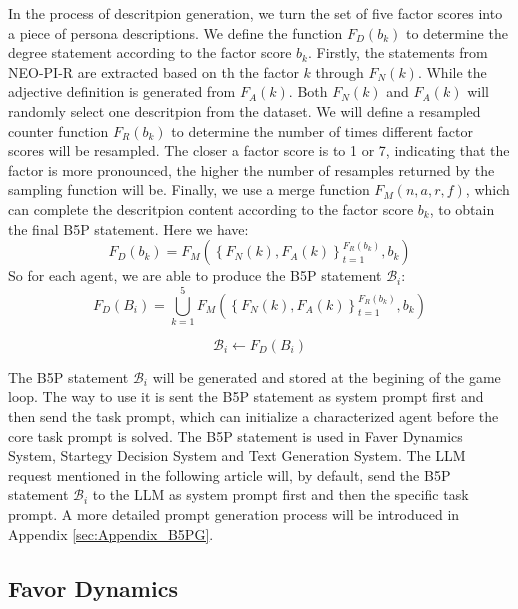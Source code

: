 \documentclass[11pt]{article}
\begin{document}
In the process of descritpion generation, we turn the set of five factor scores into a piece of persona descriptions. We define the function $ F_D(b_k) $ to determine the degree statement according to the factor score $ b_k $. Firstly, the statements from NEO-PI-R are extracted based on th the factor $ k $ through $ F_N(k) $. While the adjective definition is generated from $ F_A(k) $. Both $ F_N(k) $ and $ F_A(k) $ will randomly select one descritpion from the dataset. We will define a resampled counter function $ F_R(b_k) $ to determine the number of times different factor scores will be resampled. The closer a factor score is to 1 or 7, indicating that the factor is more pronounced, the higher the number of resamples returned by the sampling function will be. Finally, we use a merge function $ F_M(n, a, r, f) $, which can complete the descritpion content according to the factor score $ b_k $, to obtain the final B5P statement. Here we have:
\begin{equation}
  F_D(b_k) = F_M( {\left\{ F_N(k), F_A(k) \right\}}_{t=1}^{F_R(b_k)}, b_k)
\end{equation}
So for each agent, we are able to produce the B5P statement $ \mathcal{B}_i $:
\begin{equation}
   F_D(B_i) = \bigcup_{k=1}^{5} F_M( {\left\{ F_N(k), F_A(k) \right\}}_{t=1}^{F_R(b_k)}, b_k)
\end{equation}

\begin{equation}
  \mathcal{B}_i \leftarrow F_D(B_i)
\end{equation}

The B5P statement $ \mathcal{B}_i $ will be generated and stored at the begining of the game loop. The way to use it is sent the B5P statement as system prompt first and then send the task prompt, which can initialize a characterized agent before the core task prompt is solved. The B5P statement is used in Faver Dynamics System, Startegy Decision System and Text Generation System. The LLM request mentioned in the following article will, by default, send the B5P statement $ \mathcal{B}_i $ to the LLM as system prompt first and then the specific task prompt. A more detailed prompt generation process will be introduced in Appendix \ref{sec:Appendix_B5PG}.

\subsection{Favor Dynamics}
\label{sec:FavorDynamics}
\end{document}
